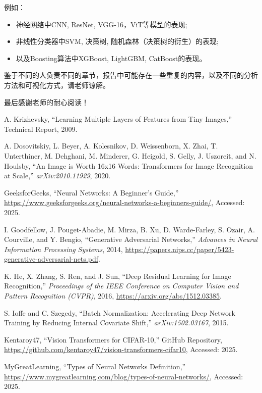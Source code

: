 \documentclass[UTF8]{report}
\theoremstyle{MyLineTheoremStyle} %
\theoremstyle{MyBlockTheoremStyle} %
\theoremstyle{MySubsubsectionStyle} %
\begin{document}
例如：
\begin{itemize}
    \item 神经网络中CNN, ResNet, VGG-16，ViT等模型的表现;
    \item 非线性分类器中SVM, 决策树, 随机森林（决策树的衍生）的表现;
    \item 以及Boosting算法中XGBoost, LightGBM, CatBoost的表现。
\end{itemize}

鉴于不同的人负责不同的章节，报告中可能存在一些重复的内容，以及不同的分析方法和可视化方式，请老师谅解。

最后感谢老师的耐心阅读！

\begin{thebibliography}{99}
A. Krizhevsky, ``Learning Multiple Layers of Features from Tiny Images,'' Technical Report, 2009.

A. Dosovitskiy, L. Beyer, A. Kolesnikov, D. Weissenborn, X. Zhai, T. Unterthiner, M. Dehghani, M. Minderer, G. Heigold, S. Gelly, J. Uszoreit, and N. Houlsby, ``An Image is Worth 16x16 Words: Transformers for Image Recognition at Scale,'' \textit{arXiv:2010.11929}, 2020.

GeeksforGeeks, ``Neural Networks: A Beginner's Guide,'' \url{https://www.geeksforgeeks.org/neural-networks-a-beginners-guide/}, Accessed: 2025.

I. Goodfellow, J. Pouget-Abadie, M. Mirza, B. Xu, D. Warde-Farley, S. Ozair, A. Courville, and Y. Bengio, ``Generative Adversarial Networks,'' \textit{Advances in Neural Information Processing Systems}, 2014, \url{https://papers.nips.cc/paper/5423-generative-adversarial-nets.pdf}.

K. He, X. Zhang, S. Ren, and J. Sun, ``Deep Residual Learning for Image Recognition,'' \textit{Proceedings of the IEEE Conference on Computer Vision and Pattern Recognition (CVPR)}, 2016, \url{https://arxiv.org/abs/1512.03385}.

S. Ioffe and C. Szegedy, ``Batch Normalization: Accelerating Deep Network Training by Reducing Internal Covariate Shift,'' \textit{arXiv:1502.03167}, 2015.

Kentaroy47, ``Vision Transformers for CIFAR-10,'' GitHub Repository, \url{https://github.com/kentaroy47/vision-transformers-cifar10}, Accessed: 2025.

MyGreatLearning, ``Types of Neural Networks Definition,'' \url{https://www.mygreatlearning.com/blog/types-of-neural-networks/}, Accessed: 2025.


\end{thebibliography}
\end{document}
